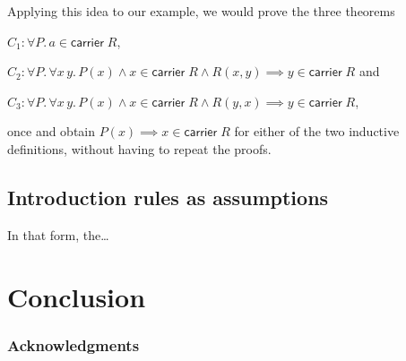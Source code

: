 \documentclass{llncs}
\newcommand{\carrier}[1]{\mathsf{carrier}\;#1}
\begin{document}
Applying this idea to our example, we would prove the three theorems 
\begin{compactitem}
\item $C_1: \forall P.\, a \in \carrier R$,
\item $C_2: \forall P.\, \forall x\,y.\,  P(x)\wedge x\in \carrier R\wedge R(x,y) \implies y \in\carrier R$ and
\item $C_3: \forall P.\, \forall x\,y.\,  P(x)\wedge x\in \carrier R\wedge R(y,x) \implies y \in\carrier R$,
\end{compactitem}
once and obtain $P(x) \implies x \in \carrier R$ for either of the two inductive definitions, without having to repeat the proofs.


\subsection{Introduction rules as assumptions}

In that form, the\dots






\section{Conclusion}

\subsubsection*{Acknowledgments}



\end{document}

